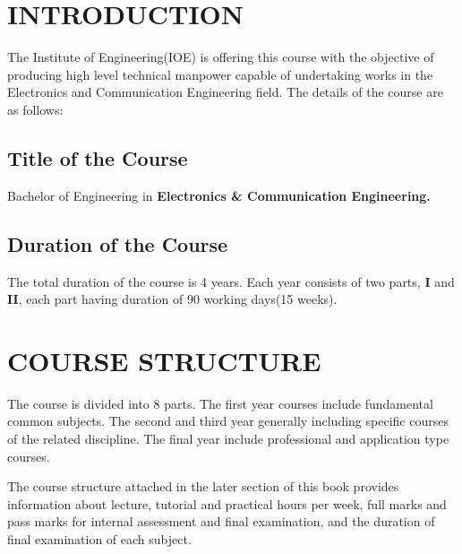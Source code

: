\section{\uppercase{Introduction}}
The Institute of Engineering(IOE) is offering this course with the objective of producing high level technical manpower capable of undertaking works in the Electronics and Communication Engineering field. The details of the course are as follows:

\subsection{Title of the Course}
    Bachelor of Engineering in \textbf{Electronics \& Communication Engineering.}
    
\subsection{Duration of the Course}
    The total duration of the course is 4 years. Each year consists of two parts, \textbf{I} and \textbf{II}, each part having duration of 90 working days(15 weeks).
    

\section{\uppercase{Course structure}}
The course is divided into 8 parts. The first year courses include fundamental common subjects. The second and third year generally including specific courses of the related discipline. The final year include professional and application type courses. 
\par
The course structure attached in the later section of this book provides information about lecture, tutorial and practical hours per week, full marks and pass marks for internal assessment and final examination, and the duration of final examination of each subject.

